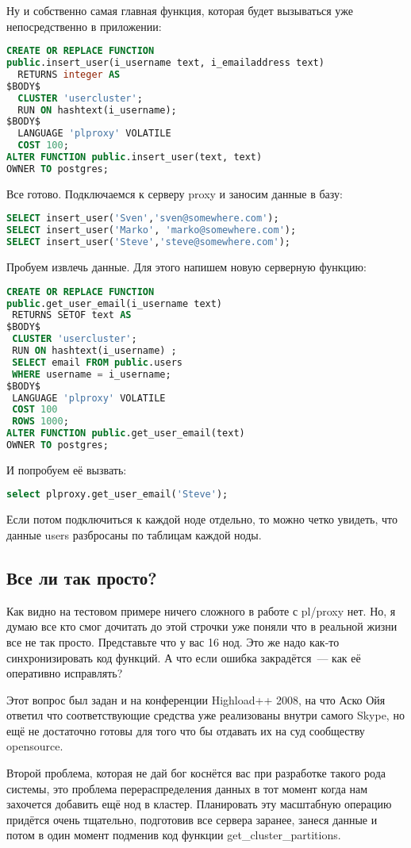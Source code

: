 Ну и собственно самая главная функция, которая будет вызываться уже непосредственно в приложении:
\begin{lstlisting}[language=SQL,label=lst:plproxy10,caption=Настройка]
CREATE OR REPLACE FUNCTION 
public.insert_user(i_username text, i_emailaddress text)
  RETURNS integer AS
$BODY$
  CLUSTER 'usercluster';
  RUN ON hashtext(i_username);
$BODY$
  LANGUAGE 'plproxy' VOLATILE
  COST 100;
ALTER FUNCTION public.insert_user(text, text) 
OWNER TO postgres;
\end{lstlisting}

Все готово. Подключаемся к серверу proxy и заносим данные в базу:
\begin{lstlisting}[language=SQL,label=lst:plproxy11,caption=Настройка]
SELECT insert_user('Sven','sven@somewhere.com');
SELECT insert_user('Marko', 'marko@somewhere.com');
SELECT insert_user('Steve','steve@somewhere.com');
\end{lstlisting}

Пробуем извлечь данные.
Для этого напишем новую серверную функцию: 
\begin{lstlisting}[language=SQL,label=lst:plproxy12,caption=Настройка]
CREATE OR REPLACE FUNCTION 
public.get_user_email(i_username text)
 RETURNS SETOF text AS
$BODY$
 CLUSTER 'usercluster';
 RUN ON hashtext(i_username) ;
 SELECT email FROM public.users 
 WHERE username = i_username;
$BODY$
 LANGUAGE 'plproxy' VOLATILE
 COST 100
 ROWS 1000;
ALTER FUNCTION public.get_user_email(text) 
OWNER TO postgres;
\end{lstlisting}

И попробуем её вызвать:
\begin{lstlisting}[language=SQL,label=lst:plproxy13,caption=Настройка]
select plproxy.get_user_email('Steve');
\end{lstlisting}

Если потом подключиться к каждой ноде отдельно, то можно четко увидеть, что данные users разбросаны по таблицам каждой ноды.

\subsection{Все ли так просто?}
Как видно на тестовом примере ничего сложного в работе с pl/proxy нет. 
Но, я думаю все кто смог дочитать до этой строчки уже поняли что в реальной жизни все не так просто.
Представьте что у вас 16 нод. Это же надо как-то синхронизировать код функций. А что если ошибка закрадётся~--- 
как её оперативно исправлять?

Этот вопрос был задан и на конференции Highload++ 2008, на что Аско Ойя ответил что соответствующие средства 
уже реализованы внутри самого Skype, но ещё не достаточно готовы для того что бы отдавать их на суд сообществу opensource.

Второй проблема, которая не дай бог коснётся вас при разработке такого рода системы, это проблема перераспределения данных 
в тот момент когда нам захочется добавить ещё нод в кластер.
Планировать эту масштабную операцию придётся очень тщательно, подготовив все сервера заранее, 
занеся данные и потом в один момент подменив код функции get\_cluster\_partitions.